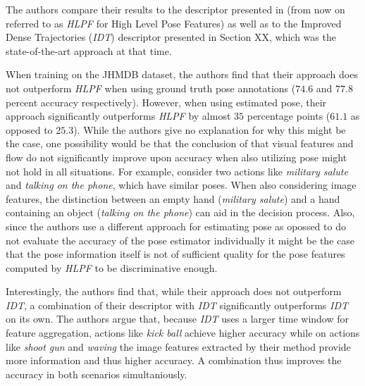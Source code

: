 The authors compare their results to the descriptor presented in  (from now on referred to as \textit{HLPF} for High Level Pose Features) as well as to the Improved Dense Trajectories (\textit{IDT}) descriptor presented in Section XX, which was the state-of-the-art approach at that time. %

When training on the JHMDB dataset, the authors find that their approach does not outperform \textit{HLPF} when using ground truth pose annotations ($74.6$ and $77.8$ percent accuracy respectively).
However, when using estimated pose, their approach significantly outperforms \textit{HLPF} by almost $35$ percentage points ($61.1$ as opposed to $25.3$).
While the authors give no explanation for why this might be the case, one possibility would be that the conclusion of \cite{jhuang_towards_2013} that visual features and flow do not significantly improve upon accuracy when also utilizing pose might not hold in all situations.
For example, consider two actions like \textit{military salute} and \textit{talking on the phone}, which have similar poses.
When also considering image features, the distinction between an empty hand (\textit{military salute}) and a hand containing an object (\textit{talking on the phone}) can aid in the decision process.
Also, since the authors use a different approach for estimating pose as opossed to \cite{jhuang_towards_2013}  do not evaluate the accuracy of the pose estimator individually it might be the case that the pose information itself is not of sufficient quality for the pose features computed by \textit{HLPF} to be discriminative enough.

Interestingly, the authors find that, while their approach does not outperform \textit{IDT}, a combination of their descriptor with \textit{IDT} significantly outperforms \textit{IDT} on its own.
The authors argue that, because \textit{IDT} uses a larger time window for feature aggregation, actions like \textit{kick ball} achieve higher accuracy while on actions like \textit{shoot gun} and \textit{waving} the image features extracted by their method provide more information and thus higher accuracy.
A combination thus improves the accuracy in both scenarios simultaniously.

